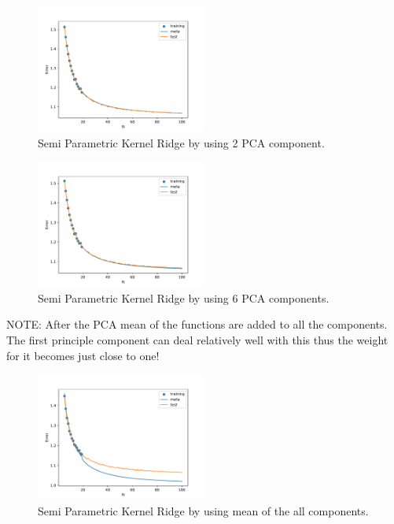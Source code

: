 \documentclass{tran-l}
\theoremstyle{definition}
\theoremstyle{remark}
\numberwithin{equation}{section}
\begin{document}
\begin{figure}[h!]
   \centering
   \includegraphics[width=0.5\textwidth]{Figures/initial_study/lr_2_pca.pdf}
   \caption{Semi Parametric Kernel Ridge by using 2 PCA component. }
\end{figure}

\begin{figure}[h!]
   \centering
   \includegraphics[width=0.5\textwidth]{Figures/initial_study/lr_6_pca.pdf}
   \caption{Semi Parametric Kernel Ridge by using 6 PCA components. }
\end{figure}

NOTE: After the PCA mean of the functions are added to all the components.  The first principle component can deal relatively well with this thus the weight for it becomes just close to one! 

\begin{figure}[h!]
   \centering
   \includegraphics[width=0.5\textwidth]{Figures/initial_study/lr_mean.pdf}
   \caption{Semi Parametric Kernel Ridge by using mean of the all components.}
\end{figure}
\end{document}
